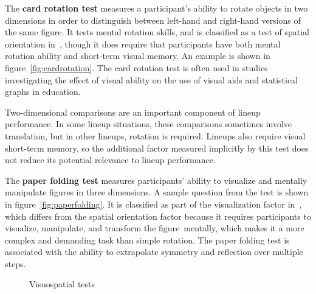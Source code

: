 \documentclass[journal]{vgtc}\usepackage[]{graphicx}\usepackage[]{color}
\begin{document}
The \textbf{card rotation test} measures a participant's ability to rotate objects in two dimensions in order to distinguish between left-hand and right-hand versions of the same figure. It tests mental rotation skills, and is classified as a test of spatial orientation in~\cite{ekstrom1976manual}, though it does require that participants have both mental rotation ability and short-term visual memory. An example is shown in figure~\ref{fig:cardrotation}. 
The card rotation test is often used in studies investigating the effect of visual ability on the use of visual aids \cite{mayer1994whom} and statistical graphs \cite{lowrie2007solving} in education.

Two-dimensional comparisons are an important component of lineup performance. In some lineup situations, these comparisons sometimes involve translation, but in other lineups, rotation is required. Lineups also require visual short-term memory, so the additional factor measured implicitly by this test does not reduce its potential relevance to lineup performance.  

The \textbf{paper folding test} measures participants' ability to visualize and mentally manipulate figures in three dimensions. A sample question from the test is shown in figure~\ref{fig:paperfolding}. It is classified as part of the visualization factor in~\cite{ekstrom1976manual}, which differs from the spatial orientation factor because it requires participants to visualize, manipulate, and transform the figure~mentally, which makes it a more complex and demanding task than simple rotation. The paper folding test is associated with the ability to extrapolate symmetry and reflection over multiple steps.

\begin{figure}[ht]
  \centering
\hfill
    \hfill
    \caption{Visuospatial tests}
    \label{fig:tests}
\end{figure}
\end{document}
